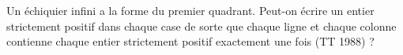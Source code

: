 Un échiquier infini a la forme du premier quadrant. Peut-on écrire un entier strictement positif dans chaque case de sorte que chaque ligne et chaque colonne contienne chaque entier strictement positif exactement une fois (TT 1988) ?
